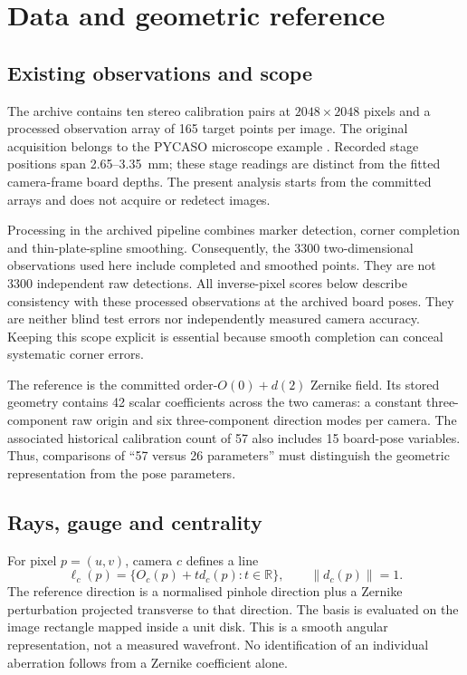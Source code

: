 \documentclass[10pt,a4paper]{article}
\begin{document}
\section{Data and geometric reference}\label{sec:data}
\subsection{Existing observations and scope}
The archive contains ten stereo calibration pairs at $2048\times2048$ pixels and a processed observation array of 165 target points per image. The original acquisition belongs to the PYCASO microscope example \citep{pycaso2023}. Recorded stage positions span 2.65--3.35~mm; these stage readings are distinct from the fitted camera-frame board depths. The present analysis starts from the committed arrays and does not acquire or redetect images.

Processing in the archived pipeline combines marker detection, corner completion and thin-plate-spline smoothing. Consequently, the 3300 two-dimensional observations used here include completed and smoothed points. They are not 3300 independent raw detections. All inverse-pixel scores below describe consistency with these processed observations at the archived board poses. They are neither blind test errors nor independently measured camera accuracy. Keeping this scope explicit is essential because smooth completion can conceal systematic corner errors.

The reference is the committed order-$O(0)+d(2)$ Zernike field. Its stored geometry contains 42 scalar coefficients across the two cameras: a constant three-component raw origin and six three-component direction modes per camera. The associated historical calibration count of 57 also includes 15 board-pose variables. Thus, comparisons of ``57 versus 26 parameters'' must distinguish the geometric representation from the pose parameters.

\subsection{Rays, gauge and centrality}\label{sec:rays}
For pixel $p=(u,v)$, camera $c$ defines a line
\begin{equation}
\ell_c(p)=\{O_c(p)+t d_c(p):t\in\mathbb R\},\qquad \|d_c(p)\|=1.
\end{equation}
The reference direction is a normalised pinhole direction plus a Zernike perturbation projected transverse to that direction. The basis is evaluated on the image rectangle mapped inside a unit disk. This is a smooth angular representation, not a measured wavefront. No identification of an individual aberration follows from a Zernike coefficient alone.
\end{document}
